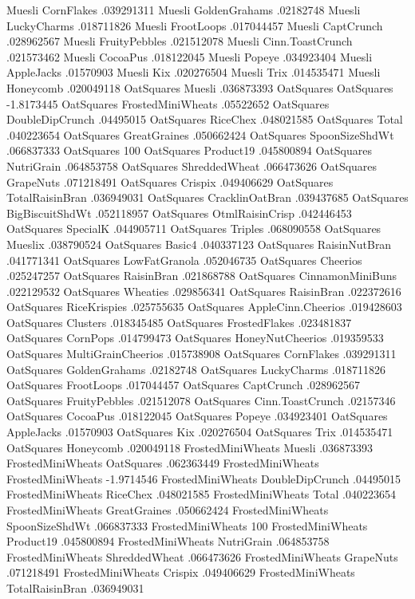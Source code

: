Muesli	CornFlakes	.039291311
Muesli	GoldenGrahams	.02182748
Muesli	LuckyCharms	.018711826
Muesli	FrootLoops	.017044457
Muesli	CaptCrunch	.028962567
Muesli	FruityPebbles	.021512078
Muesli	Cinn.ToastCrunch	.021573462
Muesli	CocoaPus	.018122045
Muesli	Popeye	.034923404
Muesli	AppleJacks	.01570903
Muesli	Kix	.020276504
Muesli	Trix	.014535471
Muesli	Honeycomb	.020049118
OatSquares	Muesli	.036873393
OatSquares	OatSquares	-1.8173445
OatSquares	FrostedMiniWheats	.05522652
OatSquares	DoubleDipCrunch	.04495015
OatSquares	RiceChex	.048021585
OatSquares	Total	.040223654
OatSquares	GreatGraines	.050662424
OatSquares	SpoonSizeShdWt	.066837333
OatSquares	100%
OatSquares	Product19	.045800894
OatSquares	NutriGrain	.064853758
OatSquares	ShreddedWheat	.066473626
OatSquares	GrapeNuts	.071218491
OatSquares	Crispix	.049406629
OatSquares	TotalRaisinBran	.036949031
OatSquares	CracklinOatBran	.039437685
OatSquares	BigBiscuitShdWt	.052118957
OatSquares	OtmlRaisinCrisp	.042446453
OatSquares	SpecialK	.044905711
OatSquares	Triples	.068090558
OatSquares	Mueslix	.038790524
OatSquares	Basic4	.040337123
OatSquares	RaisinNutBran	.041771341
OatSquares	LowFatGranola	.052046735
OatSquares	Cheerios	.025247257
OatSquares	RaisinBran	.021868788
OatSquares	CinnamonMiniBuns	.022129532
OatSquares	Wheaties	.029856341
OatSquares	RaisinBran	.022372616
OatSquares	RiceKrispies	.025755635
OatSquares	AppleCinn.Cheerios	.019428603
OatSquares	Clusters	.018345485
OatSquares	FrostedFlakes	.023481837
OatSquares	CornPops	.014799473
OatSquares	HoneyNutCheerios	.019359533
OatSquares	MultiGrainCheerios	.015738908
OatSquares	CornFlakes	.039291311
OatSquares	GoldenGrahams	.02182748
OatSquares	LuckyCharms	.018711826
OatSquares	FrootLoops	.017044457
OatSquares	CaptCrunch	.028962567
OatSquares	FruityPebbles	.021512078
OatSquares	Cinn.ToastCrunch	.02157346
OatSquares	CocoaPus	.018122045
OatSquares	Popeye	.034923401
OatSquares	AppleJacks	.01570903
OatSquares	Kix	.020276504
OatSquares	Trix	.014535471
OatSquares	Honeycomb	.020049118
FrostedMiniWheats	Muesli	.036873393
FrostedMiniWheats	OatSquares	.062363449
FrostedMiniWheats	FrostedMiniWheats	-1.9714546
FrostedMiniWheats	DoubleDipCrunch	.04495015
FrostedMiniWheats	RiceChex	.048021585
FrostedMiniWheats	Total	.040223654
FrostedMiniWheats	GreatGraines	.050662424
FrostedMiniWheats	SpoonSizeShdWt	.066837333
FrostedMiniWheats	100%
FrostedMiniWheats	Product19	.045800894
FrostedMiniWheats	NutriGrain	.064853758
FrostedMiniWheats	ShreddedWheat	.066473626
FrostedMiniWheats	GrapeNuts	.071218491
FrostedMiniWheats	Crispix	.049406629
FrostedMiniWheats	TotalRaisinBran	.036949031

